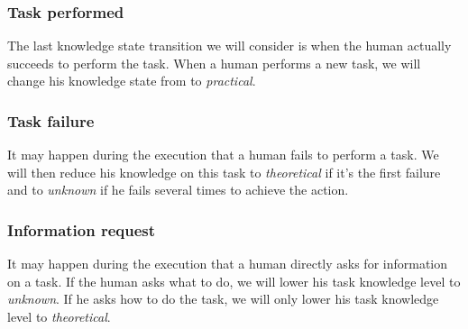 \documentclass{llncs}
\begin{document}







\subsubsection{Task performed}
The last knowledge state transition we will consider is when the human actually succeeds to perform the task. When a human performs a new task, we will change his knowledge state from to \textit{practical}.


\subsubsection{Task failure}
It may happen during the execution that a human fails to perform a task.
We will then reduce his knowledge on this task to \textit{theoretical} if it's the first failure and to \textit{unknown} if he fails several times to achieve the action.

\subsubsection{Information request}
It may happen during the execution that a human directly asks for information on a task.
If the human asks what to do, we will lower his task knowledge level to \textit{unknown}. If he asks how to do the task, we will only lower his task knowledge level to \textit{theoretical}.
\end{document}
